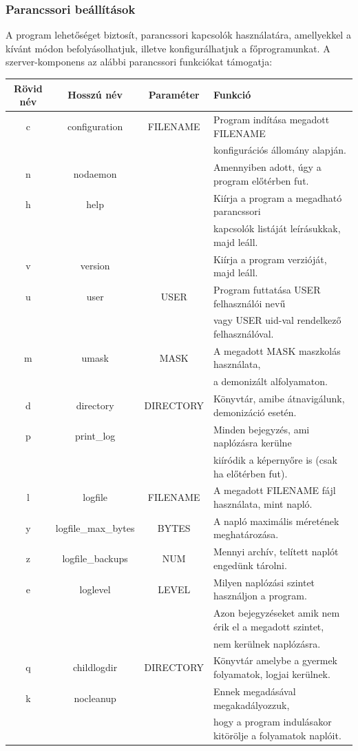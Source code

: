 \documentclass[12pt]{report}
\begin{document}
  \subsubsection{Parancssori beállítások}
  A program lehetőséget biztosít, parancssori kapcsolók használatára, amellyekkel a kívánt módon befolyásolhatjuk, illetve konfigurálhatjuk a főprogramunkat.
  A szerver-komponens az alábbi parancssori funkciókat támogatja: \\
  \begin{adjustbox}{max width=\textwidth}  
  \begin{tabular}{ c | c | c | l }
  \textbf{Rövid név} & \textbf{Hosszú név} & \textbf{Paraméter} & \textbf{Funkció} \\ \hline
  c & configuration & FILENAME & Program indítása megadott FILENAME \\
  &&&  konfigurációs állomány alapján. \\ \hline
  n & nodaemon & & Amennyiben adott, úgy a program előtérben fut. \\ \hline
  h & help & & Kiírja a program a megadható parancssori \\
  &&& kapcsolók listáját leírásukkak, majd leáll. \\ \hline
  v & version & & Kiírja a program verzióját, majd leáll. \\ \hline
  u & user & USER & Program futtatása USER felhasználói nevű \\ 
  &&& vagy USER uid-val rendelkező felhasználóval. \\ \hline
  m & umask & MASK & A megadott MASK maszkolás használata, \\
  &&& a demonizált alfolyamaton. \\ \hline
  d & directory & DIRECTORY & Könyvtár, amibe átnavigálunk, demonizáció esetén. \\ \hline
  p & print\_log & & Minden bejegyzés, ami naplózásra kerülne \\
  &&& kiíródik a képernyőre is (csak ha előtérben fut). \\ \hline
  l & logfile & FILENAME & A megadott FILENAME fájl használata, mint napló. \\ \hline
  y & logfile\_max\_bytes & BYTES & A napló maximális méretének meghatározása. \\ \hline
  z & logfile\_backups & NUM & Mennyi archív, telített naplót engedünk tárolni. \\ \hline
  e & loglevel & LEVEL & Milyen naplózási szintet használjon a program. \\
  &&& Azon bejegyzéseket amik nem érik el a megadott szintet, \\
  &&& nem kerülnek naplózásra. \\ \hline
  q & childlogdir & DIRECTORY & Könyvtár amelybe a gyermek folyamatok, logjai kerülnek. \\ \hline
  k & nocleanup & & Ennek megadásával megakadályozzuk, \\
  &&& hogy a program indulásakor kitörölje a folyamatok naplóit. \\
  \end{tabular}
  \end{adjustbox}
\end{document}
